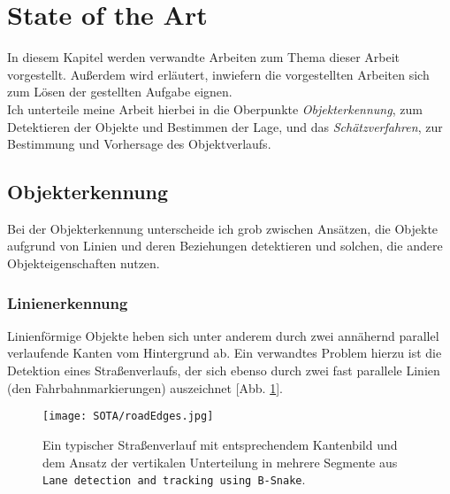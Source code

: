 \section{State of the Art}
In diesem Kapitel werden verwandte Arbeiten zum Thema dieser Arbeit vorgestellt. Außerdem wird erläutert, inwiefern die vorgestellten Arbeiten sich zum Lösen der gestellten Aufgabe eignen.\\
Ich unterteile meine Arbeit hierbei in die Oberpunkte \textit{Objekterkennung}, zum Detektieren der Objekte und Bestimmen der Lage, und das \textit{Schätzverfahren}, zur Bestimmung und Vorhersage des Objektverlaufs.
\subsection{Objekterkennung}
Bei der Objekterkennung unterscheide ich grob zwischen Ansätzen, die Objekte aufgrund von Linien und deren Beziehungen detektieren und solchen, die andere Objekteigenschaften nutzen.
\subsubsection{Linienerkennung}
Linienförmige Objekte heben sich unter anderem durch zwei annähernd parallel verlaufende Kanten vom Hintergrund ab.
Ein verwandtes Problem hierzu ist die Detektion eines Straßenverlaufs, der sich ebenso durch zwei fast parallele Linien (den Fahrbahnmarkierungen) auszeichnet [Abb. \ref{Abb. 4}].\\
\begin{figure}[H]
	\texttt{[image: SOTA/roadEdges.jpg]}
	\caption[Typischer Straßenverlauf mit entpsrechendem Kantenbild]{Ein typischer Straßenverlauf mit entsprechendem Kantenbild und dem Ansatz der vertikalen Unterteilung in mehrere Segmente aus \texttt{Lane detection and tracking using B-Snake}\cite{wang2004lane}.}
	\label{Abb. 4}
\end{figure}

